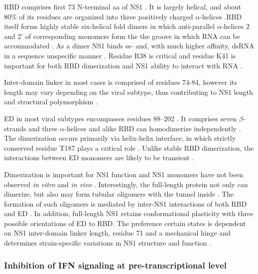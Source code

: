 		\gls{RBD} comprises first 73 N-terminal aa of \gls{NS1} \parencite{Qian1995a, Yin2007a}. It is largely helical, and about 80\% of its residues are organized into three positively charged $\alpha$-helices \parencite{Qian1995a, Liu1997a}.\gls{RBD} itself forms highly stable six-helical fold dimers in which anti-parallel $\alpha$-helices 2 and 2' of corresponding monomers form the the groove in which RNA can be accommodated \parencite{Chien1997, Wang1999a}. As a dimer NS1 binds ss- and, with much higher affinity, dsRNA in a sequence unspecific manner \parencite{Hatada1992, Chien1997, Qian1995}. Residue R38 is critical and residue K41 is important for both \gls{RBD} dimerization and \gls{NS1} ability to interact with RNA \parencite{Hatada1992, Wang1999a}.
		
		Inter-domain linker in most cases is comprised of residues 74-84, however its length may vary depending on the viral subtype, thus contributing to \gls{NS1} length and structural polymorphism \parencite{Bornholdt2006, Carrillo2014, Kerry2011}.
		
		\gls{ED} in most viral subtypes encompasses residues 88--202 \parencite{Hale2014}. It comprises seven $\beta$-strands and three $\alpha$-helices and alike \gls{RBD} can homodimerize independently \parencite{Bornholdt2006, Hale2008c, Xia2009}. The dimerization occurs primarily via helix-helix interface, in which strictly conserved residue T187 plays a critical role \parencite{Hale2008c, Kerry2011}. Unlike stable \gls{RBD} dimerization, the interactions between \gls{ED} monomers are likely to be transient \parencite{Kerry2011, Hale2014}.
		
		Dimerization is important for \gls{NS1} function and \gls{NS1} monomers have not been observed \textit{in vitro} and \textit{in vivo} \parencite{Hale2014}. Interestingly, the full-length protein not only can dimerize, but also may form tubular oligomers with the tunnel inside \parencite{Bornholdt2008}. The formation of such oligomers is mediated by inter-NS1 interactions of both \gls{RBD} and \gls{ED} \parencite{Bornholdt2008, Carrillo2014}. In addition, full-length \gls{NS1} retains conformational plasticity with three possible orientations of \gls{ED} to \gls{RBD}. The preference certain states is dependent on \gls{NS1} inter-domain linker length, residue 71 and a mechanical hinge and determines strain-specific variations in \gls{NS1} structure and function \parencite{Carrillo2014}.
		
	
		\subsubsection{Inhibition of IFN signaling at pre-transcriptional level}
		
